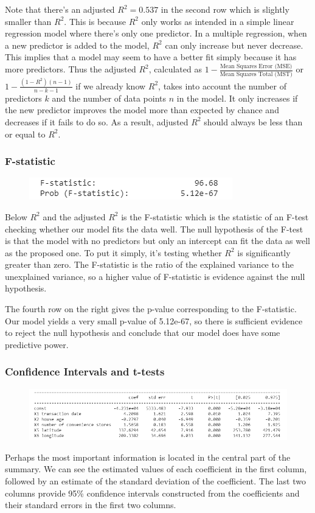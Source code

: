 \documentclass{article}
\begin{document}
Note that there's an adjusted $R^2 = 0.537$ in the second row which is slightly smaller than $R^2$. This is because $R^2$ only works as intended in a simple linear regression model where there's only one predictor. In a multiple regression, when a new predictor is added to the model, $R^2$ can only increase but never decrease. This implies that a model may seem to have a better fit simply because it has more predictors. Thus the adjusted $R^2$, calculated as $1 - \frac{\text{Mean Squares Error (MSE)}}{\text{Mean Squares Total (MST)}}$ or $1 - \frac{(1 - R^2)(n - 1)}{n - k - 1}$ if we already know $R^2$, takes into account the number of predictors $k$ and the number of data points $n$ in the model. It only increases if the new predictor improves the model more than expected by chance and decreases if it fails to do so. As a result, adjusted $R^2$ should always be less than or equal to $R^2$.
\subsubsection*{F-statistic}
\begin{figure}[H]\includegraphics[width=0.5\linewidth]{27}\end{figure}
Below $R^2$ and the adjusted $R^2$ is the F-statistic which is the statistic of an F-test checking whether our model fits the data well. The null hypothesis of the F-test is that the model with no predictors but only an intercept can fit the data as well as the proposed one. To put it simply, it's testing whether $R^2$ is significantly greater than zero. The F-statistic is the ratio of the explained variance to the unexplained variance, so a higher value of F-statistic is evidence against the null hypothesis.

The fourth row on the right gives the p-value corresponding to the F-statistic. Our model yields a very small p-value of 5.12e-67, so there is sufficient evidence to reject the null hypothesis and conclude that our model does have some predictive power.
\subsubsection*{Confidence Intervals and t-tests}
\begin{figure}[H]\includegraphics[width=\linewidth]{28}\end{figure}
Perhaps the most important information is located in the central part of the summary. We can see the estimated values of each coefficient in the first column, followed by an estimate of the standard deviation of the coefficient. The last two columns provide 95\% confidence intervals constructed from the coefficients and their standard errors in the first two columns.
\end{document}
